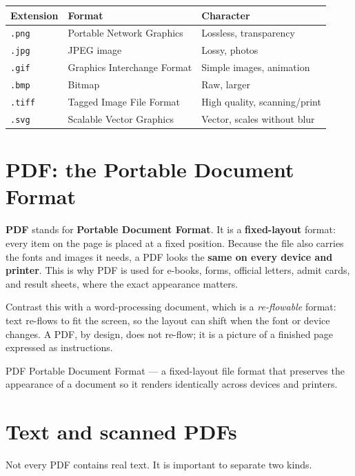 \begin{center}
\begin{tabular}{p{}p{}p{}}
\toprule
\textbf{Extension} & \textbf{Format} & \textbf{Character} \\
\midrule
\texttt{.png} & Portable Network Graphics & Lossless, transparency \\
\texttt{.jpg} & JPEG image & Lossy, photos \\
\texttt{.gif} & Graphics Interchange Format & Simple images, animation \\
\texttt{.bmp} & Bitmap & Raw, larger \\
\texttt{.tiff} & Tagged Image File Format & High quality, scanning/print \\
\texttt{.svg} & Scalable Vector Graphics & Vector, scales without blur \\
\bottomrule
\end{tabular}
\end{center}

\section{PDF: the Portable Document Format}
\textbf{PDF} stands for \textbf{Portable Document Format}. It is a
\textbf{fixed-layout} format: every item on the page is placed at a fixed
position. Because the file also carries the fonts and images it needs, a PDF
looks the \textbf{same on every device and printer}. This is why PDF is used
for e-books, forms, official letters, admit cards, and result sheets, where
the exact appearance matters.

Contrast this with a word-processing document, which is a \emph{re-flowable}
format: text re-flows to fit the screen, so the layout can shift when the
font or device changes. A PDF, by design, does not re-flow; it is a picture of
a finished page expressed as instructions.

\begin{definitionbox}{PDF}
Portable Document Format --- a fixed-layout file format that preserves the
appearance of a document so it renders identically across devices and
printers.
\end{definitionbox}

\section{Text and scanned PDFs}
Not every PDF contains real text. It is important to separate two kinds.

